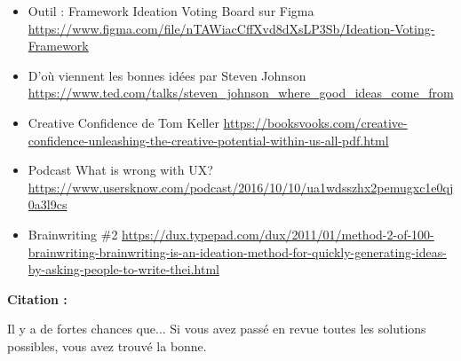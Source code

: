 \begin{itemize}
\item Outil : Framework Ideation Voting Board sur Figma \url{https://www.figma.com/file/nTAWiacCffXvd8dXsLP3Sb/Ideation-Voting-Framework}
\item D'où viennent les bonnes idées par Steven Johnson \url{https://www.ted.com/talks/steven_johnson_where_good_ideas_come_from}
\item Creative Confidence de Tom Keller \url{https://booksvooks.com/creative-confidence-unleashing-the-creative-potential-within-us-all-pdf.html}
\item Podcast What is wrong with UX? \url{https://www.usersknow.com/podcast/2016/10/10/ua1wdsszhx2pemugxc1e0qj0a3l9cs}
\item Brainwriting \#2 \url{https://dux.typepad.com/dux/2011/01/method-2-of-100-brainwriting-brainwriting-is-an-ideation-method-for-quickly-generating-ideas-by-asking-people-to-write-thei.html}
\end{itemize}

\textbf{Citation :}

Il y a de fortes chances que... Si vous avez passé en revue toutes les solutions possibles, vous avez trouvé la bonne.

